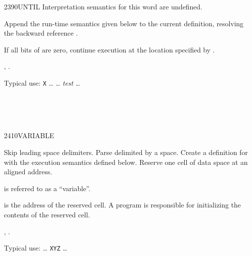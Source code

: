 \begin{worddef}{2390}{UNTIL}
\interpret
	Interpretation semantics for this word are undefined.

\compile

	Append the run-time semantics given below to the current
	definition, resolving the backward reference .

\runtime

	If all bits of  are zero, continue execution at the
	location specified by .

\see {},
	.

	\begin{rationale} %
		Typical use:
			\word{:} \texttt{X} {\ldots}
				 {\ldots} \emph{test} 
				{\ldots} \word{;}
	\end{rationale}

	\begin{testing} %
		 \\
		 \\
		 \\
	\end{testing}
\end{worddef}


\begin{worddef}{2410}{VARIABLE}
\item {}

	Skip leading space delimiters. Parse  delimited by
	a space. Create a definition for  with the execution
	semantics defined below. Reserve one cell of data space at an
	aligned address.

	 is referred to as a ``variable''.

\execute[name]

	 is the address of the reserved cell. A program
	is responsible for initializing the contents of the reserved
	cell.

\see {},
	.

	\begin{rationale} %
		Typical use:
			{\ldots}  \texttt{XYZ} {\ldots}
	\end{rationale}

	\begin{testing} %
		 \\
		 \\
	\end{testing}
\end{worddef}


